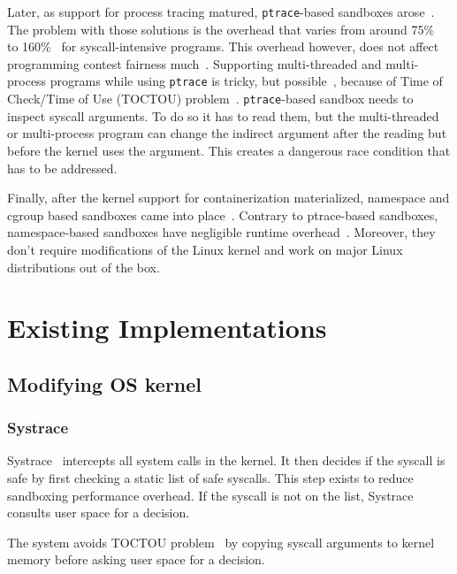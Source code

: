 \documentclass[en]{pracamgr}
\begin{document}
Later, as support for process tracing matured, \texttt{ptrace}-based sandboxes arose~\cite{marevs2007perspectives, kolstad2009infrastructure, kim2013practical}. The problem with those solutions is the overhead that varies from around 75\%~\cite{merry2010performance} to 160\%~\cite{marevs2012new} for syscall-intensive programs. This overhead however, does not affect programming contest fairness much~\cite{marevs2011fairness}. Supporting multi-threaded and multi-process programs while using \texttt{ptrace} is tricky, but possible~\cite{kim2013practical}, because of Time of Check/Time of Use (TOCTOU) problem~\cite{cwe_toctou}. \texttt{ptrace}-based sandbox needs to inspect syscall arguments. To do so it has to read them, but the multi-threaded or multi-process program can change the indirect argument after the reading but before the kernel uses the argument. This creates a dangerous race condition that has to be addressed.

Finally, after the kernel support for containerization materialized, namespace and cgroup based sandboxes came into place~\cite{marevs2012new, netblue30/firejail, raknes2016nsroot, google/nsjail, flatpak, SPACEK20151665}. Contrary to ptrace-based sandboxes, namespace-based sandboxes have negligible runtime overhead~\cite{marevs2012new}. Moreover, they don't require modifications of the Linux kernel and work on major Linux distributions out of the box.

\section{Existing Implementations}

\subsection{Modifying OS kernel}

\subsubsection{Systrace}

Systrace~\cite{provos2003improving} intercepts all system calls in the kernel. It then decides if the syscall is safe by first checking a static list of safe syscalls. This step exists to reduce sandboxing performance overhead. If the syscall is not on the list, Systrace consults user space for a decision.

The system avoids TOCTOU problem~\cite{cwe_toctou} by copying syscall arguments to kernel memory before asking user space for a decision.
\end{document}
